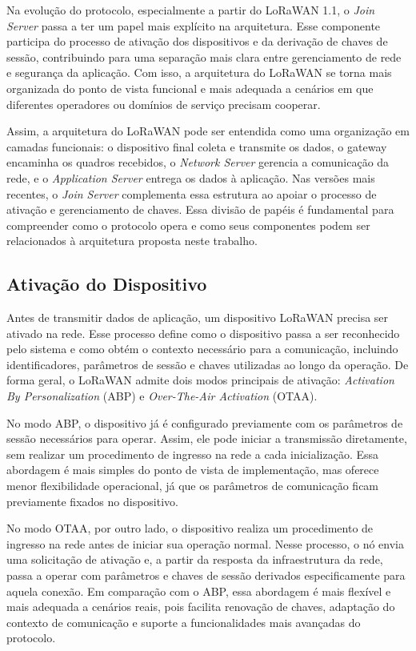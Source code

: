 Na evolução do protocolo, especialmente a partir do LoRaWAN 1.1, o \textit{Join Server} passa a ter um papel mais explícito na arquitetura. Esse componente participa do processo de ativação dos dispositivos e da derivação de chaves de sessão, contribuindo para uma separação mais clara entre gerenciamento de rede e segurança da aplicação. Com isso, a arquitetura do LoRaWAN se torna mais organizada do ponto de vista funcional e mais adequada a cenários em que diferentes operadores ou domínios de serviço precisam cooperar.

Assim, a arquitetura do LoRaWAN pode ser entendida como uma organização em camadas funcionais: o dispositivo final coleta e transmite os dados, o gateway encaminha os quadros recebidos, o \textit{Network Server} gerencia a comunicação da rede, e o \textit{Application Server} entrega os dados à aplicação. Nas versões mais recentes, o \textit{Join Server} complementa essa estrutura ao apoiar o processo de ativação e gerenciamento de chaves. Essa divisão de papéis é fundamental para compreender como o protocolo opera e como seus componentes podem ser relacionados à arquitetura proposta neste trabalho.


\subsection{Ativação do Dispositivo}

Antes de transmitir dados de aplicação, um dispositivo LoRaWAN precisa ser ativado na rede. Esse processo define como o dispositivo passa a ser reconhecido pelo sistema e como obtém o contexto necessário para a comunicação, incluindo identificadores, parâmetros de sessão e chaves utilizadas ao longo da operação. De forma geral, o LoRaWAN admite dois modos principais de ativação: \textit{Activation By Personalization} (ABP) e \textit{Over-The-Air Activation} (OTAA). \cite{hessel2023lorawan}

No modo ABP, o dispositivo já é configurado previamente com os parâmetros de sessão necessários para operar. Assim, ele pode iniciar a transmissão diretamente, sem realizar um procedimento de ingresso na rede a cada inicialização. Essa abordagem é mais simples do ponto de vista de implementação, mas oferece menor flexibilidade operacional, já que os parâmetros de comunicação ficam previamente fixados no dispositivo.

No modo OTAA, por outro lado, o dispositivo realiza um procedimento de ingresso na rede antes de iniciar sua operação normal. Nesse processo, o nó envia uma solicitação de ativação e, a partir da resposta da infraestrutura da rede, passa a operar com parâmetros e chaves de sessão derivados especificamente para aquela conexão. Em comparação com o ABP, essa abordagem é mais flexível e mais adequada a cenários reais, pois facilita renovação de chaves, adaptação do contexto de comunicação e suporte a funcionalidades mais avançadas do protocolo.

